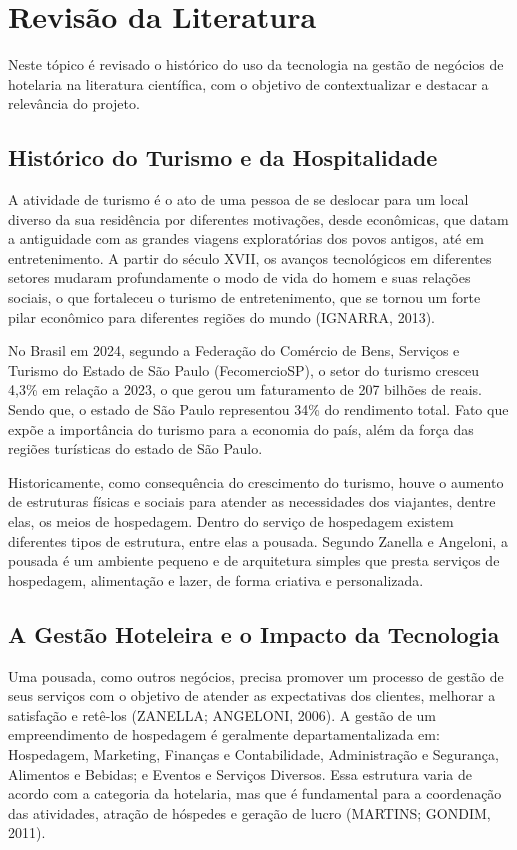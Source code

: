 \section {Revisão da Literatura}
Neste tópico é revisado o histórico do uso da tecnologia na gestão de negócios de hotelaria na literatura científica, com o objetivo de contextualizar e destacar a relevância do projeto.

\subsection{Histórico do Turismo e da Hospitalidade} 
A atividade de turismo é o ato de uma pessoa de se deslocar para um local diverso da sua residência por diferentes motivações, desde econômicas, que datam a antiguidade com as grandes viagens exploratórias dos povos antigos, até em entretenimento.  A partir do século XVII, os avanços tecnológicos em diferentes setores mudaram profundamente o modo de vida do homem e suas relações sociais, o que fortaleceu o turismo de entretenimento, que se tornou um forte pilar econômico para diferentes regiões do mundo (IGNARRA, 2013).

No Brasil em 2024, segundo a Federação do Comércio de Bens, Serviços e Turismo do Estado de São Paulo (FecomercioSP), o setor do turismo cresceu 4,3\% em relação a 2023, o que gerou um faturamento de 207 bilhões de reais. Sendo que, o estado de São Paulo representou 34\% do rendimento total. Fato que expõe a importância do turismo para a economia  do país, além da força das regiões turísticas do estado de São Paulo. 

Historicamente, como consequência do crescimento do turismo, houve o aumento de estruturas físicas e sociais para atender as necessidades dos viajantes, dentre elas, os meios de hospedagem. Dentro do serviço de hospedagem existem diferentes tipos de estrutura, entre elas a pousada. Segundo Zanella e Angeloni,  a pousada é um ambiente pequeno e de arquitetura simples que presta serviços de hospedagem, alimentação e lazer, de forma criativa e personalizada. 

\subsection{A Gestão Hoteleira e o Impacto da Tecnologia}
Uma pousada, como outros negócios, precisa promover um processo de gestão de seus serviços com o objetivo de atender as expectativas dos clientes, melhorar a satisfação e retê-los (ZANELLA; ANGELONI, 2006). A gestão de um empreendimento de hospedagem é geralmente departamentalizada em: Hospedagem, Marketing, Finanças e Contabilidade, Administração e Segurança, Alimentos e Bebidas; e Eventos e Serviços Diversos. Essa estrutura varia de acordo com a categoria da hotelaria, mas que é fundamental para a coordenação das atividades, atração de hóspedes e geração de lucro (MARTINS; GONDIM, 2011).

